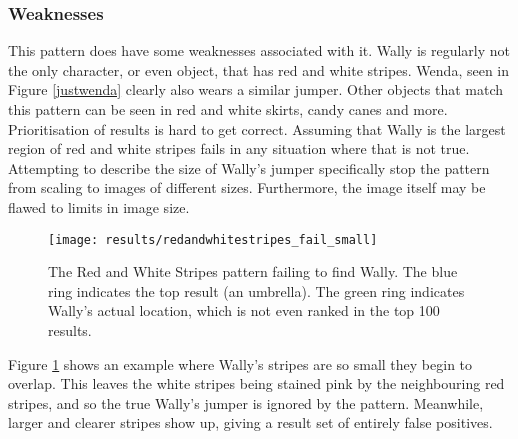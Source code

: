 \documentclass[../main.tex]{subfiles}
\begin{document}
    \subsubsection{Weaknesses}
      This pattern does have some weaknesses associated with it.
      Wally is regularly not the only character, or even object, that has red and white stripes.
      Wenda, seen in Figure \ref{justwenda} clearly also wears a similar jumper.
      Other objects that match this pattern can be seen in red and white skirts, candy canes and more.
      Prioritisation of results is hard to get correct.
      Assuming that Wally is the largest region of red and white stripes fails in any situation where that is not true.
      Attempting to describe the size of Wally's jumper specifically stop the pattern from scaling to images of different sizes.
      Furthermore, the image itself may be flawed to limits in image size.
      \begin{figure}[h]
        \centering
        \texttt{[image: results/redandwhitestripes\_fail\_small]}
        \caption{
          The Red and White Stripes pattern failing to find Wally.
          The blue ring indicates the top result (an umbrella).
          The green ring indicates Wally's actual location, which is not even ranked in the top 100 results.
        }
        \label{rws_fail_small}
      \end{figure}
      Figure \ref{rws_fail_small} shows an example where Wally's stripes are so small they begin to overlap.
      This leaves the white stripes being stained pink by the neighbouring red stripes, and so the true Wally's jumper is ignored by the pattern.
      Meanwhile, larger and clearer stripes show up, giving a result set of entirely false positives.
\end{document}
